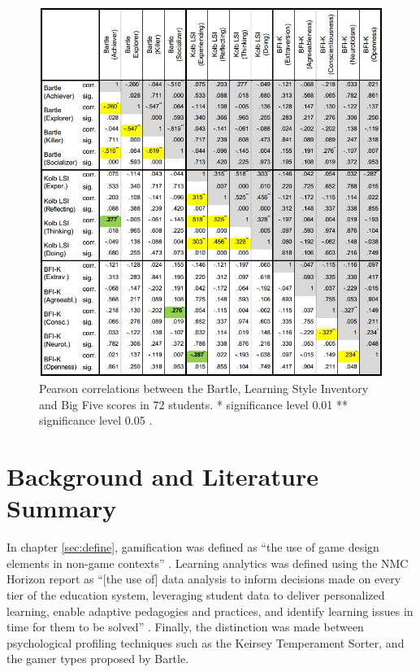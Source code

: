 \documentclass[12pt,a4paper,twoside]{report}
\begin{document}
\begin{figure}
\begin{center}
	\includegraphics[width=1\textwidth]{../img/bartle-big5.png}
	\caption{Pearson correlations between the Bartle, Learning Style Inventory and Big Five scores in 72 students. * significance level 0.01 ** significance level 0.05  \cite{konertmodeling}.}
	\label{correlation}
\end{center}
\end{figure}

\chapter{Background and Literature Summary}
In chapter \ref{sec:define}, gamification was defined as ``the use of game design elements in non-game contexts'' \cite{deterding2011game}. Learning analytics was defined using the NMC Horizon report\cite{johnson2014nmc} as ``[the use of] data analysis to inform decisions made on every tier of the education system, leveraging student data to deliver personalized learning, enable adaptive pedagogies and practices, and identify learning issues in time for them to be solved'' \cite{johnson2014nmc}. Finally, the distinction was made between psychological profiling techniques such as the Keirsey Temperament Sorter, and the gamer types proposed by Bartle.
\end{document}

